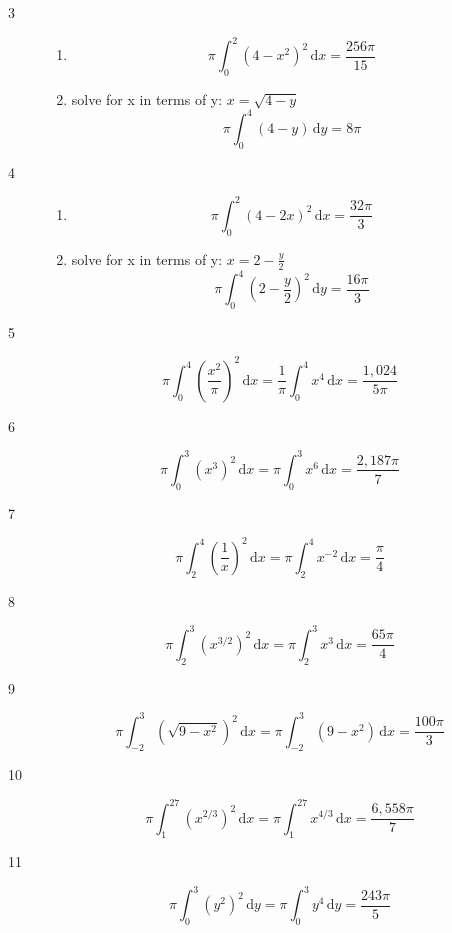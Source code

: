 \documentclass{exam}
\begin{document}
\begin{description}
\item[3]
\begin{enumerate}[a]
\item
\[
  \pi \int_0^2 (4 - x^2)^2 \, \mathrm{d}x = \frac{256 \pi}{15}
\]

\item
solve for x in terms of y: $x = \sqrt{4 - y}$
\[
  \pi \int_0^4 (4 - y) \, \mathrm{d}y = 8 \pi
\]
\end{enumerate}

\item[4]
\begin{enumerate}[a]
\item
\[
  \pi \int_0^2 (4 - 2x)^2 \, \mathrm{d}x = \frac{32 \pi}{3}
\]

\item
solve for x in terms of y: $x = 2 - \frac{y}{2}$
\[
  \pi \int_0^4 \left( 2 - \frac{y}{2} \right)^2 \, \mathrm{d}y = \frac{16 \pi}{3}
\]

\end{enumerate}

\item[5]

\[
  \pi \int_0^4 \left( \frac{x^2}{\pi} \right)^2 \, \mathrm{d}x = \frac{1}{\pi} \int_0^4 x^4 \, \mathrm{d}x = \frac{1,024}{5 \pi}
\]

\item[6]
\[
  \pi \int_0^3 \left( x^3 \right)^2 \, \mathrm{d}x = \pi \int_0^3 x^6 \, \mathrm{d}x = \frac{2,187 \pi}{7}
\]

\item[7]
\[
  \pi \int_2^4 \left( \frac{1}{x} \right)^2 \, \mathrm{d}x = \pi \int_2^4 x^{-2} \, \mathrm{d}x = \frac{\pi}{4}
\]

\item[8]
\[
  \pi \int_2^3 \left( x^{3/2} \right)^2 \, \mathrm{d}x = \pi \int_2^3 x^3 \, \mathrm{d}x = \frac{65 \pi}{4}
\]

\item[9]
\[
  \pi \int_{-2}^3 \left( \sqrt{9 - x^2} \right)^2 \, \mathrm{d}x = \pi \int_{-2}^3 \left(9 - x^2 \right) \, \mathrm{d}x = \frac{100 \pi}{3}
\]

\item[10]
\[
  \pi \int_1^{27} \left( x^{2/3} \right)^2 \, \mathrm{d}x = \pi \int_1^{27} x^{4/3} \, \mathrm{d}x = \frac{6,558 \pi}{7}
\]

\item[11]
\[
  \pi \int_0^3 \left( y^2 \right)^2 \, \mathrm{d}y = \pi \int_0^3 y^4 \, \mathrm{d}y = \frac{243 \pi}{5}
\]


\end{description}
\end{document}
